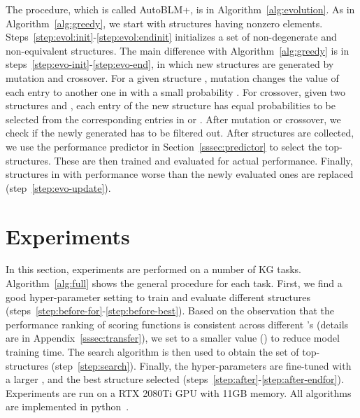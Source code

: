\documentclass[10pt,journal,compsoc]{IEEEtran}
\begin{document}
The procedure,
which is called AutoBLM+,
is in Algorithm~\ref{alg:evolution}.
As in Algorithm~\ref{alg:greedy},
we start with structures having  nonzero elements.
Steps~\ref{step:evol:init}-\ref{step:evol:endinit}
initializes a set  of  non-degenerate and non-equivalent structures.
The main difference with 
Algorithm~\ref{alg:greedy}
is in steps~\ref{step:evo-init}-\ref{step:evo-end},
in which new structures are generated 
by mutation and crossover.
For a given structure ,
mutation changes the value of 
each entry to another one in  
with 
a small 
probability .
For crossover,
given two structures   and ,
each entry of the new structure
has equal probabilities
to be selected from 
the corresponding entries in 
  or .
After mutation or crossover,
we check if the newly generated  
has to be filtered out. 
After  structures are collected,
we 
use the performance predictor  in Section~\ref{sssec:predictor}
to select the top- structures.
These are then trained and evaluated for actual performance.
Finally, structures in  with performance 
worse than the newly
evaluated ones are replaced
(step~\ref{step:evo-update}).





\section{Experiments}

In this section,
experiments are performed on a number of KG tasks.
Algorithm~\ref{alg:full} shows the general 
procedure for each task. First,
we find a good hyper-parameter setting 
to train and evaluate different structures
(steps~\ref{step:before-for}-\ref{step:before-best}).
Based on the observation that the performance ranking of scoring functions is
consistent across different 's (details are in Appendix~\ref{sssec:transfer}),
we set  to a smaller value ()
to reduce model training time.
The search algorithm 
is then used
to obtain the set  of top-
structures (step~\ref{step:search}).
Finally,
the hyper-parameters 
are fine-tuned
with a larger , and 
the best structure
selected 
(steps~\ref{step:after}-\ref{step:after-endfor}).
Experiments are run on a RTX 2080Ti GPU with 11GB memory.  All algorithms are implemented in python~\cite{paszke2017automatic}.
\end{document}
